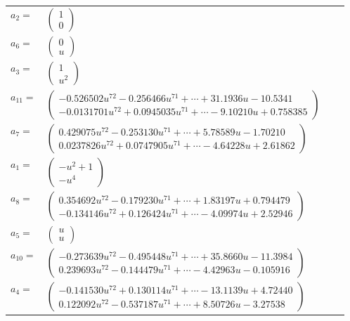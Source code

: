 \documentclass[1p]{elsarticle_modified}
\theoremstyle{definition}
\begin{document}
\begin{tabular}{m{7pt} m{180pt} m{7pt} m{180pt} }
\flushright $a_{2}=$&$\begin{pmatrix}1\\0\end{pmatrix}$ \\
\flushright $a_{6}=$&$\begin{pmatrix}0\\u\end{pmatrix}$ \\
\flushright $a_{3}=$&$\begin{pmatrix}1\\u^2\end{pmatrix}$ \\
\flushright $a_{11}=$&$\begin{pmatrix}-0.526502 u^{72}-0.256466 u^{71}+\cdots+31.1936 u-10.5341\\-0.0131701 u^{72}+0.0945035 u^{71}+\cdots-9.10210 u+0.758385\end{pmatrix}$ \\
\flushright $a_{7}=$&$\begin{pmatrix}0.429075 u^{72}-0.253130 u^{71}+\cdots+5.78589 u-1.70210\\0.0237826 u^{72}+0.0747905 u^{71}+\cdots-4.64228 u+2.61862\end{pmatrix}$ \\
\flushright $a_{1}=$&$\begin{pmatrix}- u^2+1\\- u^4\end{pmatrix}$ \\
\flushright $a_{8}=$&$\begin{pmatrix}0.354692 u^{72}-0.179230 u^{71}+\cdots+1.83197 u+0.794479\\-0.134146 u^{72}+0.126424 u^{71}+\cdots-4.09974 u+2.52946\end{pmatrix}$ \\
\flushright $a_{5}=$&$\begin{pmatrix}u\\u\end{pmatrix}$ \\
\flushright $a_{10}=$&$\begin{pmatrix}-0.273639 u^{72}-0.495448 u^{71}+\cdots+35.8660 u-11.3984\\0.239693 u^{72}-0.144479 u^{71}+\cdots-4.42963 u-0.105916\end{pmatrix}$ \\
\flushright $a_{4}=$&$\begin{pmatrix}-0.141530 u^{72}+0.130114 u^{71}+\cdots-13.1139 u+4.72440\\0.122092 u^{72}-0.537187 u^{71}+\cdots+8.50726 u-3.27538\end{pmatrix}$ \\

\end{tabular}
\end{document}
